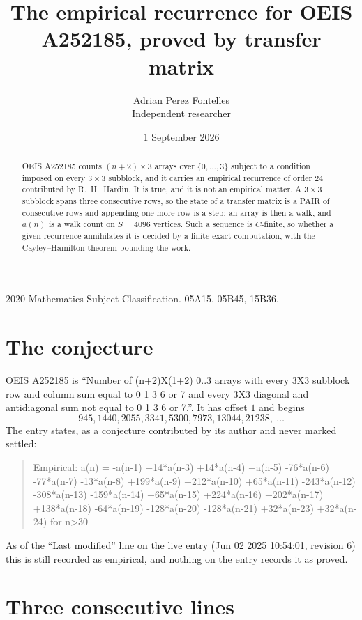 \documentclass[11pt,a4paper]{article}
\title{The empirical recurrence for OEIS A252185, proved by transfer matrix}
\author{Adrian Perez Fontelles\\ \small Independent researcher}
\date{1 September 2026}
\theoremstyle{plain}
\theoremstyle{definition}
\begin{document}
\maketitle

\begin{abstract}
OEIS A252185 counts $(n+2)\times3$ arrays over $\{0,\dots,3\}$ subject to a condition imposed on
every $3\times3$ subblock, and it carries an empirical recurrence of order $24$
contributed by R.~H.~Hardin. It is true, and it is not an empirical matter. A $3\times3$
subblock spans three consecutive rows, so the state of a transfer matrix is a PAIR of
consecutive rows and appending one more row is a step; an array is then a walk, and
$a(n)$ is a walk count on $S=4096$ vertices. Such a sequence is $C$-finite, so whether a given
recurrence annihilates it is decided by a finite exact computation, with the Cayley--Hamilton
theorem bounding the work.
\end{abstract}

\noindent\small 2020 Mathematics Subject Classification. 05A15, 05B45, 15B36.\normalsize

\section{The conjecture}

OEIS A252185 is ``Number of (n+2)X(1+2) 0..3 arrays with every 3X3 subblock row and column sum equal to 0 1 3 6 or 7 and every 3X3 diagonal and antidiagonal sum not equal to 0 1 3 6 or 7.''. It has offset $1$ and begins
\[
945, 1440, 2055, 3341, 5300, 7973, 13044, 21238,\ \dots
\]
The entry states, as a conjecture contributed by its author and never marked settled:
\begin{quote}
Empirical: a(n) = -a(n-1) +14*a(n-3) +14*a(n-4) +a(n-5) -76*a(n-6) -77*a(n-7) -13*a(n-8) +199*a(n-9) +212*a(n-10) +65*a(n-11) -243*a(n-12) -308*a(n-13) -159*a(n-14) +65*a(n-15) +224*a(n-16) +202*a(n-17) +138*a(n-18) -64*a(n-19) -128*a(n-20) -128*a(n-21) +32*a(n-23) +32*a(n-24) for n>30
\end{quote}
As of the ``Last modified'' line on the live entry (Jun 02 2025 10:54:01, revision 6) this is still
recorded as empirical, and nothing on the entry records it as proved.

\section{Three consecutive lines}
\end{document}
